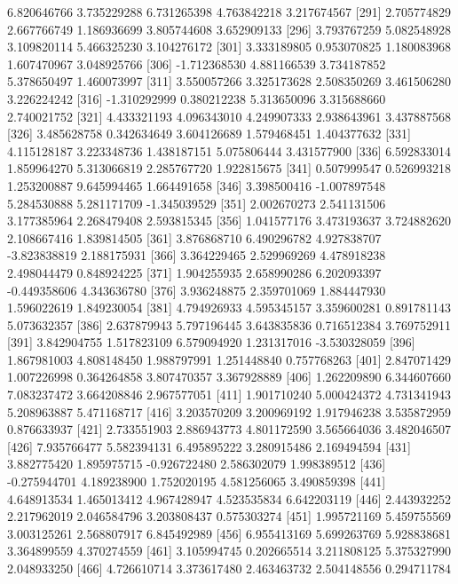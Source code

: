 \documentclass[12pt]{article}
\begin{document}
\begin{Schunk}
\begin{Soutput}
 [286]  6.820646766  3.735229288  6.731265398  4.763842218  3.217674567
 [291]  2.705774829  2.667766749  1.186936699  3.805744608  3.652909133
 [296]  3.793767259  5.082548928  3.109820114  5.466325230  3.104276172
 [301]  3.333189805  0.953070825  1.180083968  1.607470967  3.048925766
 [306] -1.712368530  4.881166539  3.734187852  5.378650497  1.460073997
 [311]  3.550057266  3.325173628  2.508350269  3.461506280  3.226224242
 [316] -1.310292999  0.380212238  5.313650096  3.315688660  2.740021752
 [321]  4.433321193  4.096343010  4.249907333  2.938643961  3.437887568
 [326]  3.485628758  0.342634649  3.604126689  1.579468451  1.404377632
 [331]  4.115128187  3.223348736  1.438187151  5.075806444  3.431577900
 [336]  6.592833014  1.859964270  5.313066819  2.285767720  1.922815675
 [341]  0.507999547  0.526993218  1.253200887  9.645994465  1.664491658
 [346]  3.398500416 -1.007897548  5.284530888  5.281171709 -1.345039529
 [351]  2.002670273  2.541131506  3.177385964  2.268479408  2.593815345
 [356]  1.041577176  3.473193637  3.724882620  2.108667416  1.839814505
 [361]  3.876868710  6.490296782  4.927838707 -3.823838819  2.188175931
 [366]  3.364229465  2.529969269  4.478918238  2.498044479  0.848924225
 [371]  1.904255935  2.658990286  6.202093397 -0.449358606  4.343636780
 [376]  3.936248875  2.359701069  1.884447930  1.596022619  1.849230054
 [381]  4.794926933  4.595345157  3.359600281  0.891781143  5.073632357
 [386]  2.637879943  5.797196445  3.643835836  0.716512384  3.769752911
 [391]  3.842904755  1.517823109  6.579094920  1.231317016 -3.530328059
 [396]  1.867981003  4.808148450  1.988797991  1.251448840  0.757768263
 [401]  2.847071429  1.007226998  0.364264858  3.807470357  3.367928889
 [406]  1.262209890  6.344607660  7.083237472  3.664208846  2.967577051
 [411]  1.901710240  5.000424372  4.731341943  5.208963887  5.471168717
 [416]  3.203570209  3.200969192  1.917946238  3.535872959  0.876633937
 [421]  2.733551903  2.886943773  4.801172590  3.565664036  3.482046507
 [426]  7.935766477  5.582394131  6.495895222  3.280915486  2.169494594
 [431]  3.882775420  1.895975715 -0.926722480  2.586302079  1.998389512
 [436] -0.275944701  4.189238900  1.752020195  4.581256065  3.490859398
 [441]  4.648913534  1.465013412  4.967428947  4.523535834  6.642203119
 [446]  2.443932252  2.217962019  2.046584796  3.203808437  0.575303274
 [451]  1.995721169  5.459755569  3.003125261  2.568807917  6.845492989
 [456]  6.955413169  5.699263769  5.928838681  3.364899559  4.370274559
 [461]  3.105994745  0.202665514  3.211808125  5.375327990  2.048933250
 [466]  4.726610714  3.373617480  2.463463732  2.504148556  0.294711784

\end{Soutput}
\end{Schunk}
\end{document}
